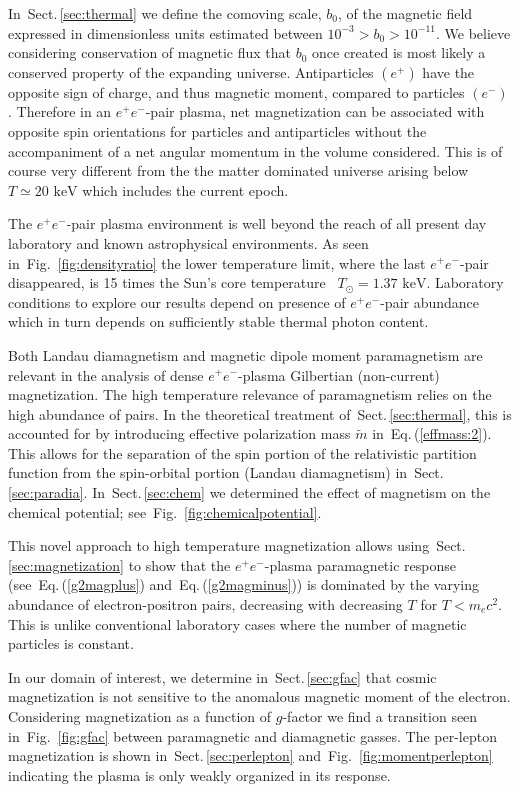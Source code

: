 \documentclass[aps,prd,floatfix,reprint]{revtex4-2}
\newcommand*{\keV}{\text{ keV}}
\newcommand{\req}[1]{Eq.\,(\ref{#1})}
\newcommand{\rf}[1]{Fig.~{\ref{#1}}}
\newcommand{\rsec}[1]{Sect.\,{\ref{#1}}}
\begin{document}
In~\rsec{sec:thermal} we define the comoving scale, $b_{0}$, of the magnetic field expressed in dimensionless units estimated between $10^{-3}>b_{0}>10^{-11}$. We believe considering conservation of magnetic flux that $b_{0}$ once created is most likely a conserved property of the expanding universe. Antiparticles $(e^{+})$ have the opposite sign of charge, and thus magnetic moment, compared to particles $(e^{-})$. Therefore in an $e^{+}e^{-}$-pair plasma, net magnetization can be associated with opposite spin orientations for particles and antiparticles without the accompaniment of a net angular momentum in the volume considered. This is of course very different from the the matter dominated universe arising below $T\simeq 20\keV$ which includes the current epoch.

The $e^{+}e^{-}$-pair plasma environment is well beyond the reach of all present day laboratory and known astrophysical environments. As seen in~\rf{fig:densityratio} the lower temperature limit, where the last $e^{+}e^{-}$-pair disappeared, is 15 times the Sun's core temperature~\cite{Bahcall:2000nu} $T_{\odot}=1.37\keV$. Laboratory conditions to explore our results depend on presence of $e^{+}e^{-}$-pair abundance which in turn depends on sufficiently stable thermal photon content.

Both Landau diamagnetism and magnetic dipole moment paramagnetism are relevant in the analysis of dense $e^{+}e^{-}$-plasma Gilbertian (non-current) magnetization. The high temperature relevance of paramagnetism relies on the high abundance of pairs. In the theoretical treatment of~\rsec{sec:thermal}, this is accounted for by introducing effective polarization mass $\tilde{m}$ in~\req{effmass:2}. This allows for the separation of the spin portion of the relativistic partition function from the spin-orbital portion (Landau diamagnetism) in~\rsec{sec:paradia}. In~\rsec{sec:chem} we determined the effect of magnetism on the chemical potential; 
see~\rf{fig:chemicalpotential}.

This novel approach to high temperature magnetization allows using~\rsec{sec:magnetization} to show that the $e^{+}e^{-}$-plasma paramagnetic response (see~\req{g2magplus} and~\req{g2magminus}) is dominated by the varying abundance of electron-positron pairs, decreasing with decreasing $T$ for $T<m_{e}c^2$. This is unlike conventional laboratory cases where the number of magnetic particles is constant. 

In our domain of interest, we determine in~\rsec{sec:gfac} that cosmic magnetization is not sensitive to the anomalous magnetic moment of the electron. Considering magnetization as a function of $g$-factor we find a transition seen in~\rf{fig:gfac} between paramagnetic and diamagnetic gasses. The per-lepton magnetization is shown in~\rsec{sec:perlepton} and~\rf{fig:momentperlepton} indicating the plasma is only weakly organized in its response.
\end{document}
